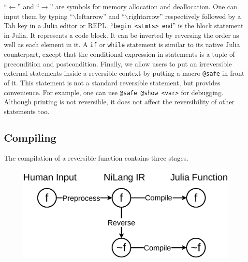\documentclass{article}
\newcommand{\<}{\langle}
\renewcommand{\>}{\rangle}
\theoremstyle{definition}\newtheorem{definition}{\textit{Definition}}
\begin{document}
``\texttt{$\leftarrow$}'' and ``\texttt{$\rightarrow$}'' are symbols for memory allocation and deallocation. One can input them by typing ``$\backslash$leftarrow'' and ``$\backslash$rightarrow'' respectively followed by a Tab key in a Julia editor or REPL.
``\texttt{begin <stmts> end}'' is the block statement in Julia. It represents a code block.
It can be inverted by reversing the order as well as each element in it.
A \texttt{if} or \texttt{while} statement is similar to its native Julia counterpart, except that the conditional expression in statements is a tuple of precondition and postcondition.
Finally, we allow users to put an irreversible external statements inside a reversible context by putting a macro \texttt{@safe} in front of it.
This statement is not a standard reversible statement, but provides convenience.
For example, one can use \texttt{@safe @show <var>} for debugging.
Although printing is not reversible, it does not affect the reversibility of other statements too.

\subsection{Compiling}
The compilation of a reversible function contains three stages.

\begin{figure}[H]
    \centerline{\includegraphics[width=0.5\columnwidth,trim={0cm 0cm 0 0cm},clip]{compiling.pdf}}
\end{figure}
\end{document}
